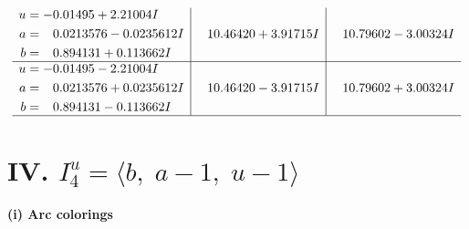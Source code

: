 \documentclass[1p]{elsarticle_modified}
\theoremstyle{definition}
\begin{document}
$$\begin{array}{c|c|c}
\begin{aligned}
u &= -0.01495 + 2.21004 I \\
a &= \phantom{-}0.0213576 - 0.0235612 I \\
b &= \phantom{-}0.894131 + 0.113662 I\end{aligned}
 & \phantom{-}10.46420 + 3.91715 I & \phantom{-}10.79602 - 3.00324 I \\ \hline\begin{aligned}
u &= -0.01495 - 2.21004 I \\
a &= \phantom{-}0.0213576 + 0.0235612 I \\
b &= \phantom{-}0.894131 - 0.113662 I\end{aligned}
 & \phantom{-}10.46420 - 3.91715 I & \phantom{-}10.79602 + 3.00324 I\\
 \hline 
 \end{array}$$\newpage\newpage\renewcommand{\arraystretch}{1}
\centering \section*{IV. $I^u_{4}= \langle b,\;a-1,\;u-1 \rangle$}
\flushleft \textbf{(i) Arc colorings}\\
\end{document}
